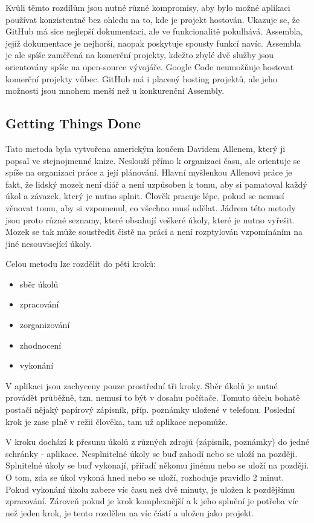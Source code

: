 Kvůli těmto rozdílům jsou nutné různé kompromisy, aby bylo možné aplikaci používat konzistentně bez ohledu na to, kde je projekt hostován. Ukazuje se, že GitHub má sice nejlepší dokumentaci, ale ve funkcionalitě pokulhává. Assembla, jejíž dokumentace je nejhorší, naopak poskytuje spousty funkcí navíc. Assembla je ale spíše zaměřená na komerční projekty, kdežto zbylé dvě služby jsou orientovány spíše na open-source vývojáře. Google Code neumožňuje hostovat komerční projekty vůbec. GitHub má i placený hosting projektů, ale jeho možnosti jsou mnohem menší než u konkurenční Assembly.

\subsection{Getting Things Done}

Tato metoda byla vytvořena americkým koučem Davidem Allenem\cite{gtd:web,gtd:wiki}, který ji popsal ve stejnojmenné knize\cite{gtd:book}. Neslouží přímo k organizaci času, ale orientuje se spíše na organizaci práce a její plánování. Hlavní myšlenkou Allenovi práce je fakt, že lidský mozek není diář a není uzpůsoben k tomu, aby si pamatoval každý úkol a závazek, který je nutno splnit. Člověk pracuje lépe, pokud se nemusí věnovat tomu, aby si vzpomenul, co všechno musí udělat. Jádrem této metody jsou proto různé seznamy, které obsahují veškeré úkoly, které je nutno vyřešit. Mozek se tak může soustředit čistě na práci a není rozptylován vzpomínáním na jiné nesouvisející úkoly.

Celou metodu lze rozdělit do pěti kroků:

\begin{itemize}
\item sběr úkolů
\item zpracování
\item zorganizování
\item zhodnocení
\item vykonání
\end{itemize}

V aplikaci jsou zachyceny pouze prostřední tři kroky. Sběr úkolů je nutné provádět průběžně, tzn. nemusí to být v dosahu počítače. Tomuto účelu bohatě postačí nějaký papírový zápisník, příp. poznámky uložené v telefonu. Poslední krok  je zase plně v režii člověka, tam už aplikace nepomůže.

V kroku  dochází k přesunu úkolů z různých zdrojů (zápisník, poznámky) do jedné schránky - aplikace. Nesplnitelné úkoly se buď zahodí nebo se uloží na později. Splnitelné úkoly se buď vykonají, přiřadí někomu jinému nebo se uloží na později. O tom, zda se úkol vykoná hned nebo se uloží, rozhoduje pravidlo 2 minut. Pokud vykonání úkolu zabere víc času než dvě minuty, je uložen k pozdějšímu zpracování. Zároveň pokud je krok komplexnější a k jeho splnění je potřeba víc než jeden krok, je tento rozdělen na víc částí a uložen jako projekt.

